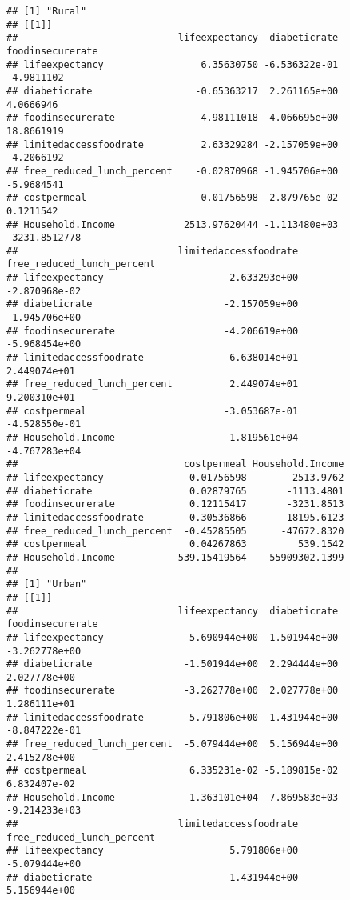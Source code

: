 \documentclass[]{article}
\begin{document}
\begin{verbatim}
## [1] "Rural"
## [[1]]
##                            lifeexpectancy  diabeticrate foodinsecurerate
## lifeexpectancy                 6.35630750 -6.536322e-01       -4.9811102
## diabeticrate                  -0.65363217  2.261165e+00        4.0666946
## foodinsecurerate              -4.98111018  4.066695e+00       18.8661919
## limitedaccessfoodrate          2.63329284 -2.157059e+00       -4.2066192
## free_reduced_lunch_percent    -0.02870968 -1.945706e+00       -5.9684541
## costpermeal                    0.01756598  2.879765e-02        0.1211542
## Household.Income            2513.97620444 -1.113480e+03    -3231.8512778
##                            limitedaccessfoodrate free_reduced_lunch_percent
## lifeexpectancy                      2.633293e+00              -2.870968e-02
## diabeticrate                       -2.157059e+00              -1.945706e+00
## foodinsecurerate                   -4.206619e+00              -5.968454e+00
## limitedaccessfoodrate               6.638014e+01               2.449074e+01
## free_reduced_lunch_percent          2.449074e+01               9.200310e+01
## costpermeal                        -3.053687e-01              -4.528550e-01
## Household.Income                   -1.819561e+04              -4.767283e+04
##                             costpermeal Household.Income
## lifeexpectancy               0.01756598        2513.9762
## diabeticrate                 0.02879765       -1113.4801
## foodinsecurerate             0.12115417       -3231.8513
## limitedaccessfoodrate       -0.30536866      -18195.6123
## free_reduced_lunch_percent  -0.45285505      -47672.8320
## costpermeal                  0.04267863         539.1542
## Household.Income           539.15419564    55909302.1399
## 
## [1] "Urban"
## [[1]]
##                            lifeexpectancy  diabeticrate foodinsecurerate
## lifeexpectancy               5.690944e+00 -1.501944e+00    -3.262778e+00
## diabeticrate                -1.501944e+00  2.294444e+00     2.027778e+00
## foodinsecurerate            -3.262778e+00  2.027778e+00     1.286111e+01
## limitedaccessfoodrate        5.791806e+00  1.431944e+00    -8.847222e-01
## free_reduced_lunch_percent  -5.079444e+00  5.156944e+00     2.415278e+00
## costpermeal                  6.335231e-02 -5.189815e-02     6.832407e-02
## Household.Income             1.363101e+04 -7.869583e+03    -9.214233e+03
##                            limitedaccessfoodrate free_reduced_lunch_percent
## lifeexpectancy                      5.791806e+00              -5.079444e+00
## diabeticrate                        1.431944e+00               5.156944e+00

\end{verbatim}
\end{document}

